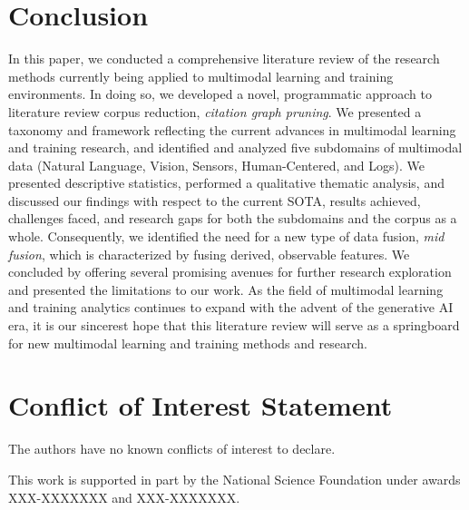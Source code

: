 \documentclass[manuscript,screen,review]{acmart}
\begin{document}
\section{Conclusion}
In this paper, we conducted a comprehensive literature review of the research methods currently being applied to multimodal learning and training environments. In doing so, we developed a novel, programmatic approach to literature review corpus reduction, \textit{citation graph pruning}. We presented a taxonomy and framework reflecting the current advances in multimodal learning and training research, and identified and analyzed five subdomains of multimodal data (Natural Language, Vision, Sensors, Human-Centered, and Logs). We presented descriptive statistics, performed a qualitative thematic analysis, and discussed our findings with respect to the current SOTA, results achieved, challenges faced, and research gaps for both the subdomains and the corpus as a whole. Consequently, we identified the need for a new type of data fusion, \textit{mid fusion}, which is characterized by fusing derived, observable features. We concluded by offering several promising avenues for further research exploration and presented the limitations to our work. As the field of multimodal learning and training analytics continues to expand with the advent of the generative AI era, it is our sincerest hope that this literature review will serve as a springboard for new multimodal learning and training methods and research.

\section*{Conflict of Interest Statement}
The authors have no known conflicts of interest to declare. 

\begin{acks} 
This work is supported in part by the National Science Foundation under awards XXX-XXXXXXX and XXX-XXXXXXX.
\end{acks}




\appendix


\end{document}
